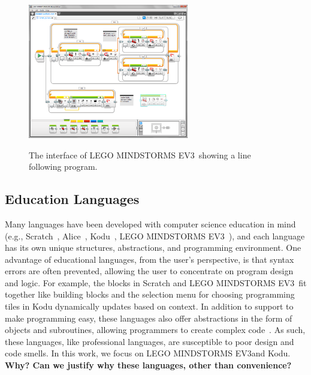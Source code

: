 \documentclass[conference]{IEEEtran}
\newcommand{\ms}{LEGO MINDSTORMS EV3}
\newcommand{\todo}[1]{\textbf{#1}}
\begin{document}
\begin{figure} [tb]
\caption{The interface of \ms~showing a line following program.}
\centering
\includegraphics[width=7cm]{img/ms}
\label{fig:ms}
\end{figure}

\subsection{Education Languages}

Many languages have been developed with computer science education in mind (e.g., Scratch~\cite{scratch}, Alice~\cite{aliceIntro}, Kodu~\cite{kodugrammar}, \ms~\cite{lego}), and each language has its own unique structures, abstractions, and programming environment. One advantage of
educational languages, from the user's perspective, is that syntax errors are often prevented, allowing the user to concentrate on program design and logic. For example, the blocks in Scratch and \ms~fit together like building blocks and the selection menu for choosing programming tiles in Kodu dynamically updates based on context. In addition to support to make programming easy, these languages also offer abstractions in the form of objects and subroutines, allowing programmers to create complex code~\cite{Stolee:2011:ECS:1953163.1953197}. As such, these languages, like professional languages, are susceptible to poor design and code smells. In this work, we focus on \ms and Kodu. 
\todo{Why? Can we justify why these languages, other than convenience?}
\end{document}
